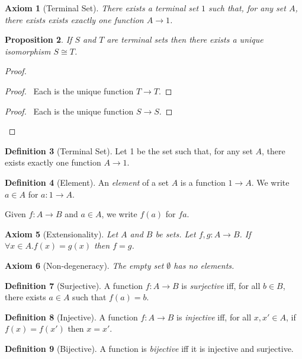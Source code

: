 \documentclass{book}
\let\qed\relax
\newtheorem{ax}{Axiom}[chapter]
\newtheorem{prop}[ax]{Proposition}
\theoremstyle{definition}
\newtheorem{df}[ax]{Definition}
\begin{document}
\begin{ax}[Terminal Set]
There exists a \emph{terminal} set $1$ such that, for any set $A$, there exists exists exactly one function $A \rightarrow 1$.
\end{ax}

\begin{prop}
If $S$ and $T$ are terminal sets then there exists a unique isomorphism $S \cong T$.
\end{prop}

\begin{proof}
\pf
{}
\begin{proof}
	\pf\ Each is the unique function $T \rightarrow T$.
\end{proof}
\begin{proof}
	\pf\ Each is the unique function $S \rightarrow S$.
\end{proof}
\qed
\end{proof}

\begin{df}[Terminal Set]
Let 1 be the set such that, for any set $A$, there exists exactly one function $A \rightarrow 1$.
\end{df}

\begin{df}[Element]
An \emph{element} of a set $A$ is a function $1 \rightarrow A$. We write $a \in A$ for $a : 1 \rightarrow A$.

Given $f : A \rightarrow B$ and $a \in A$, we write $f(a)$ for $fa$.
\end{df}

\begin{ax}[Extensionality]
Let $A$ and $B$ be sets. Let $f,g : A \rightarrow B$. If $\forall x \in A. f(x) = g(x)$ then $f = g$.
\end{ax}

\begin{ax}[Non-degeneracy]
The empty set $\emptyset$ has no elements.
\end{ax}

\begin{df}[Surjective]
A function $f : A \rightarrow B$ is \emph{surjective} iff, for all $b \in B$, there exists $a \in A$ such that $f(a) = b$.
\end{df}

\begin{df}[Injective]
A function $f : A \rightarrow B$ is \emph{injective} iff, for all $x, x' \in A$, if $f(x) = f(x')$ then $x = x'$.
\end{df}

\begin{df}[Bijective]
A function is \emph{bijective} iff it is injective and surjective.
\end{df}

\end{document}
